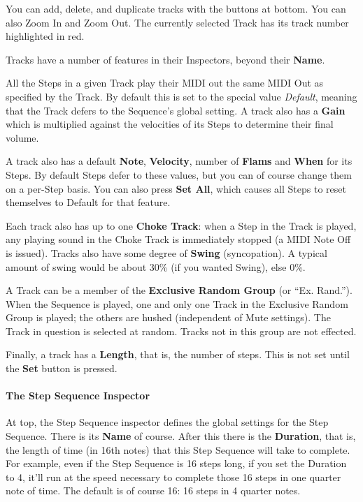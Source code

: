 \documentclass[twoside,10pt]{article}
\begin{document}
You can add, delete, and duplicate tracks with the buttons at bottom.  You can also Zoom In and Zoom Out.  The currently selected Track has its track number highlighted in red.

Tracks have a number of features in their Inspectors, beyond their {\bf Name}.

All the Steps in a given Track play their MIDI out the same MIDI Out as specified by the Track.  By default this is set to the special value {\it Default}, meaning that the Track defers to the Sequence's global setting.  A track also has a {\bf Gain} which is multiplied against the velocities of its Steps to determine their final volume.  

A track also has a default {\bf Note}, {\bf Velocity}, number of {\bf Flams} and {\bf When} for its Steps.  By default Steps defer to these values, but you can of course change them on a per-Step basis.  You can also press {\bf Set All}, which causes all Steps to reset themselves to Default for that feature.

Each track also has up to one {\bf Choke Track}: when a Step in the Track is played, any playing sound in the Choke Track is immediately stopped (a MIDI Note Off is issued).  Tracks also have some degree of {\bf Swing} (syncopation).  A typical amount of swing would be about 30\% (if you wanted Swing), else 0\%.

A Track can be a member of the {\bf Exclusive Random Group} (or ``Ex. Rand.'').  When the Sequence is played, one and only one Track in the Exclusive Random Group is played; the others are hushed (independent of Mute settings).  The Track in question is selected at random. Tracks not in this group are not effected.

Finally, a track has a {\bf Length}, that is, the number of steps.  This is not set until the {\bf Set} button is pressed.

\paragraph{The Step Sequence Inspector}

At top, the Step Sequence inspector defines the global settings for the Step Sequence.  There is its {\bf Name} of course.  After this there is the {\bf Duration}, that is, the length of time (in 16th notes) that this Step Sequence will take to complete.  For example, even if the Step Sequence is 16 steps long, if you set the Duration to 4, it'll run at the speed necessary to complete those 16 steps in one quarter note of time.  The default is of course 16: 16 steps in 4 quarter notes.
\end{document}
